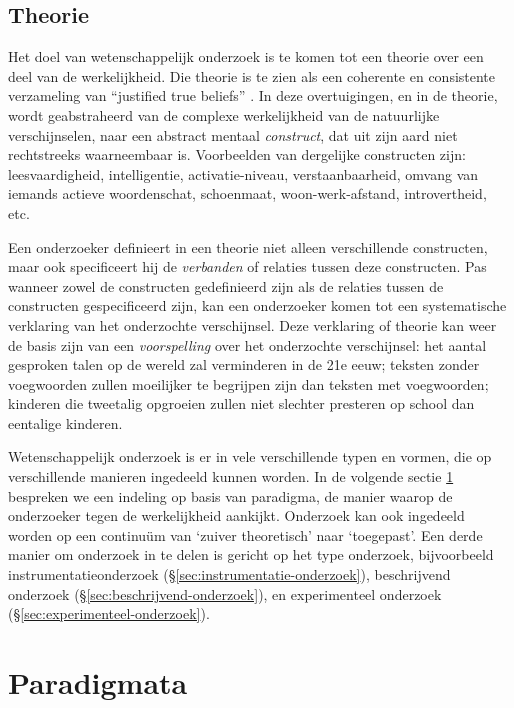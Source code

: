 \documentclass[
]{book}
\begin{document}
\hypertarget{sec:theorie}{%
\subsection{Theorie}\label{sec:theorie}}

Het doel van wetenschappelijk
onderzoek is te komen tot een theorie over een deel van de
werkelijkheid. Die theorie is te zien als een coherente en consistente
verzameling van ``justified true beliefs'' \citep{Mort03}. In deze
overtuigingen, en in de theorie, wordt geabstraheerd van de complexe
werkelijkheid van de natuurlijke verschijnselen, naar een abstract
mentaal \emph{construct}, dat uit zijn aard niet rechtstreeks waarneembaar
is. Voorbeelden van dergelijke constructen zijn: leesvaardigheid,
intelligentie, activatie-niveau, verstaanbaarheid, omvang van iemands
actieve woordenschat, schoenmaat, woon-werk-afstand, introvertheid, etc.

Een onderzoeker definieert in een theorie niet alleen verschillende
constructen, maar ook specificeert hij de \emph{verbanden} of relaties tussen
deze constructen. Pas wanneer zowel de constructen gedefinieerd zijn als
de relaties tussen de constructen gespecificeerd zijn, kan een
onderzoeker komen tot een systematische verklaring van het onderzochte
verschijnsel. Deze verklaring of theorie kan weer de basis zijn van een
\emph{voorspelling} over het onderzochte verschijnsel: het aantal gesproken
talen op de wereld zal verminderen in de 21e eeuw; teksten zonder
voegwoorden zullen moeilijker te begrijpen zijn dan teksten met
voegwoorden; kinderen die tweetalig opgroeien zullen niet slechter
presteren op school dan eentalige kinderen.

Wetenschappelijk onderzoek is er in vele verschillende typen en vormen,
die op verschillende manieren ingedeeld kunnen worden. In de volgende sectie \ref{sec:paradigmata} bespreken we een indeling op basis van
paradigma, de manier waarop de onderzoeker tegen de werkelijkheid
aankijkt. Onderzoek kan ook ingedeeld worden op een continuüm van
`zuiver theoretisch' naar `toegepast'. Een derde manier om onderzoek in
te delen is gericht op het type onderzoek, bijvoorbeeld
instrumentatieonderzoek (§\ref{sec:instrumentatie-onderzoek}), beschrijvend onderzoek (§\ref{sec:beschrijvend-onderzoek}),
en experimenteel onderzoek (§\ref{sec:experimenteel-onderzoek}).

\hypertarget{sec:paradigmata}{%
\section{Paradigmata}\label{sec:paradigmata}}
\end{document}
